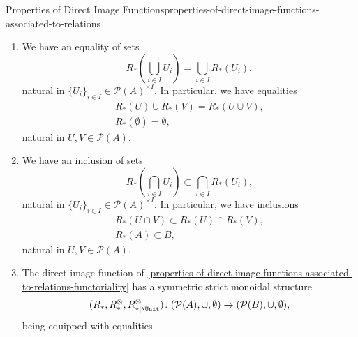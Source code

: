 \begin{proposition}{Properties of Direct Image Functions}{properties-of-direct-image-functions-associated-to-relations}
\begin{enumerate}
\begin{itemize}
\begin{itemize}
                    \end{itemize}
            \end{itemize}
        \item\label{properties-of-direct-image-functions-associated-to-relations-preservation-of-colimits}We have an equality of sets
            \[
                R_{*}(\bigcup_{i\in I}U_{i})%
                =%
                \bigcup_{i\in I}R_{*}(U_{i}),%
            \]%
            natural in $\{U_{i}\}_{i\in I}\in\mathcal{P}(A)^{\times I}$. In particular, we have equalities%
            \[
                \begin{gathered}
                    R_{*}(U)\cup R_{*}(V)                  = R_{*}(U\cup V),\\
                    R_{*}(\emptyset)                       = \emptyset,
                \end{gathered}
            \]%
            natural in $U,V\in\mathcal{P}(A)$.
        \item\label{properties-of-direct-image-functions-associated-to-relations-oplax-preservation-of-limits}We have an inclusion of sets
            \[
                R_{*}(\bigcap_{i\in I}U_{i})%
                \subset%
                \bigcap_{i\in I}R_{*}(U_{i}),%
            \]%
            natural in $\{U_{i}\}_{i\in I}\in\mathcal{P}(A)^{\times I}$. In particular, we have inclusions%
            \[
                \begin{gathered}
                    R_{*}(U\cap V) \subset R_{*}(U)\cap R_{*}(V),\\
                    R_{*}(A)       \subset B,
                \end{gathered}
            \]%
            natural in $U,V\in\mathcal{P}(A)$.
        \item\label{properties-of-direct-image-functions-associated-to-relations-symmetric-strict-monoidality-with-respect-to-unions}The direct image function of \cref{properties-of-direct-image-functions-associated-to-relations-functoriality} has a symmetric strict monoidal structure
            \[
                (R_{*},R^{\otimes}_{*},R^{\otimes}_{*|\Unit})
                \colon
                (\mathcal{P}(A),\cup,\emptyset)
                \to
                (\mathcal{P}(B),\cup,\emptyset),
            \]%
            being equipped with equalities%
            \[
                \begin{gathered}

\end{gathered}\]
\end{enumerate}
\end{proposition}
